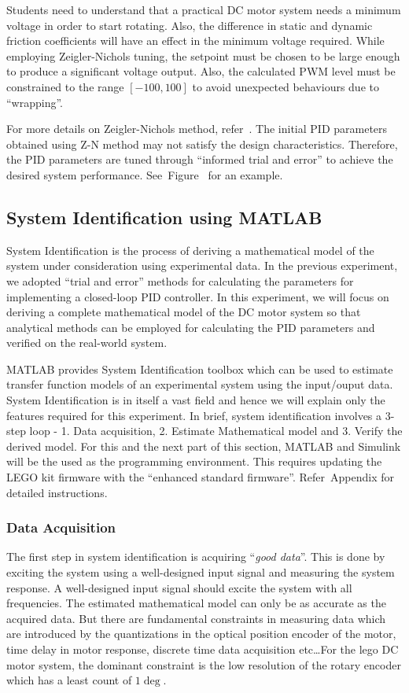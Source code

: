 \documentclass[paper=a4, fontsize=11pt]{scrartcl}
\numberwithin{equation}{section}        %
\numberwithin{figure}{section}          %
\numberwithin{table}{section}           %
\begin{document}
Students need to understand that a practical DC motor system needs a minimum voltage in order to start rotating. Also, the difference in static and dynamic friction coefficients will have an effect in the minimum voltage required. While employing Zeigler-Nichols tuning, the setpoint must be chosen to be large enough to produce a significant voltage output. Also, the calculated PWM level must be constrained to the range $[-100,100]$ to avoid unexpected behaviours due to ``wrapping''.

For more details on Zeigler-Nichols method, refer~\cite{Appendix:ZN}. The initial PID parameters obtained using Z-N method may not satisfy the design characteristics. Therefore, the PID parameters are tuned through ``informed trial and error'' to achieve the desired system performance. See~Figure~\cite{fig:ZNTuning} for an example.

\subsection{System Identification using MATLAB}
System Identification is the process of deriving a mathematical model of the system under consideration using experimental data. In the previous experiment, we adopted ``trial and error'' methods for calculating the parameters for implementing a closed-loop PID controller. In this experiment, we will focus on deriving a complete mathematical model of the DC motor system so that analytical methods can be employed for calculating the PID parameters and verified on the real-world system.

MATLAB provides System Identification toolbox which can be used to estimate transfer function models of an experimental system using the input/ouput data. System Identification is in itself a vast field and hence we will explain only the features required for this experiment. In brief, system identification involves a 3-step loop - 1. Data acquisition, 2. Estimate Mathematical model and 3. Verify the derived model. For this and the next part of this section, MATLAB and Simulink will be the used as the programming environment. This requires updating the LEGO kit firmware with the ``enhanced standard firmware''. Refer~Appendix\cite{Appendix:Firmware} for detailed instructions.

\subsubsection{Data Acquisition}
The first step in system identification is acquiring ``\emph{good data}''. This is done by exciting the system using a well-designed input signal and measuring the system response. A well-designed input signal should excite the system with all frequencies. The estimated mathematical model can only be as accurate as the acquired data. But there are fundamental constraints in measuring data which are introduced by the quantizations in the optical position encoder of the motor, time delay in motor response, discrete time data acquisition etc\ldots For the lego DC motor system, the dominant constraint is the low resolution of the rotary encoder which has a least count of $1\deg$.
\end{document}
